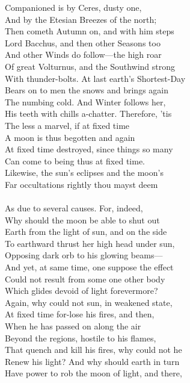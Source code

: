 Companioned is by Ceres, dusty one,\\
And by the Etesian Breezes of the north;\\
Then cometh Autumn on, and with him steps\\
Lord Bacchus, and then other Seasons too\\
And other Winds do follow—the high roar\\
Of great Volturnus, and the Southwind strong\\
With thunder-bolts. At last earth's Shortest-Day\\
Bears on to men the snows and brings again\\
The numbing cold. And Winter follows her,\\
His teeth with chills a-chatter. Therefore, 'tis\\
The less a marvel, if at fixed time\\
A moon is thus begotten and again\\
At fixed time destroyed, since things so many\\
Can come to being thus at fixed time.\\
Likewise, the sun's eclipses and the moon's\\
Far occultations rightly thou mayst deem\\
\\
As due to several causes. For, indeed,\\
Why should the moon be able to shut out\\
Earth from the light of sun, and on the side\\
To earthward thrust her high head under sun,\\
Opposing dark orb to his glowing beams—\\
And yet, at same time, one suppose the effect\\
Could not result from some one other body\\
Which glides devoid of light forevermore?\\
Again, why could not sun, in weakened state,\\
At fixed time for-lose his fires, and then,\\
When he has passed on along the air\\
Beyond the regions, hostile to his flames,\\
That quench and kill his fires, why could not he\\
Renew his light? And why should earth in turn\\
Have power to rob the moon of light, and there,\\
